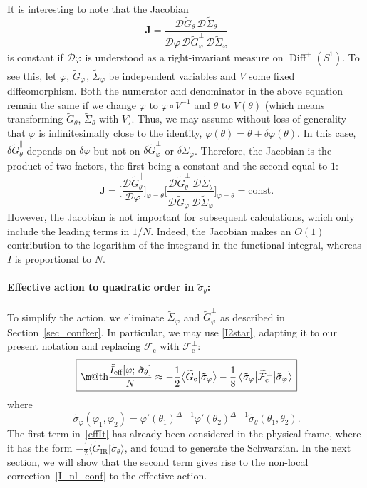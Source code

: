 \documentclass[12pt]{article}
\makeatletter
\newcommand*{\wideboxed}[1]{\setlength{\fboxsep}{1ex}%
  \fbox{\m@th$\displaystyle#1$}}
\newcommand{\blangle}{\bigl\langle}
\newcommand{\brangle}{\bigr\rangle}
\newcommand*{\brakett}[2]{\langle{#1}|{#2}\rangle}
\newcommand*{\bbraa}[1]{\blangle{#1}\big|}
\newcommand*{\bkett}[1]{\big|{#1}\brangle}
\newcommand*{\bbrakett}[2]{\blangle{#1}\big|{#2}\brangle}
\newcommand{\calD}{\mathcal{D}}
\newcommand{\calF}{\mathcal{F}}
\newcommand{\const}{\mathrm{const}}
\DeclareMathOperator{\Diff}{Diff}
\newcommand{\cc}{\mathrm{c}}
\newcommand{\eff}{\text{eff}}
\newcommand{\IR}{\text{IR}}
\newcommand{\tI}{\tilde{I}}
\newcommand{\tG}{\widetilde{G}}
\newcommand{\tF}{\widetilde{\calF}}
\newcommand{\tSig}{\widetilde{\Sigma}}
\newcommand{\tsig}{\tilde{\sigma}}
\newcommand{\vp}{\varphi}
\makeatother
\begin{document}
It is interesting to note that the Jacobian
\begin{equation}\label{Jacobian}
\mathbf{J}=\frac{\calD\tG_{\theta}\,\calD\tSig_{\theta}}
{\calD\vp\,\calD\tG_{\vp}^{\perp}\,\calD\tSig_{\vp}}
\end{equation}
is constant if $\calD\vp$ is understood as a right-invariant measure on $\Diff^{+}(S^1)$. To see this, let $\vp$, $\tG_{\vp}^{\perp}$, $\tSig_{\vp}$ be independent variables and $V$ some fixed diffeomorphism. Both the numerator and denominator in the above equation remain the same if we change $\vp$ to $\vp\circ V^{-1}$ and $\theta$ to $V(\theta)$ (which means transforming $\tG_{\theta}$, $\tSig_{\theta}$ with $V$). Thus, we may assume without loss of generality that $\vp$ is infinitesimally close to the identity, $\vp(\theta)=\theta+\delta\vp(\theta)$. In this case, $\delta\tG_{\theta}^{\parallel}$ depends on $\delta\vp$ but not on $\delta\tG_{\vp}^{\perp}$ or $\delta\tSig_{\vp}$. Therefore, the Jacobian is the product of two factors, the first being a constant and the second equal to $1$:
\begin{equation}
\mathbf{J}=\biggl[\frac{\calD\tG_{\theta}^{\parallel}}
{\calD\vp}\biggr]_{\vp=\theta}
\biggl[\frac{\calD\tG_{\theta}^{\perp}\,\calD\tSig_{\theta}}
{\calD\tG_{\vp}^{\perp}\,\calD\tSig_{\vp}}\biggr]_{\vp=\theta}
=\const.
\end{equation}
However, the Jacobian is not important for subsequent calculations, which only include the leading terms in $1/N$. Indeed, the Jacobian makes an $O(1)$ contribution to the logarithm of the integrand in the functional integral, whereas $\tI$ is proportional to $N$.

\paragraph{Effective action to quadratic order in $\tsig_\theta$:}
To simplify the action, we eliminate $\tSig_{\vp}$ and $\tG_{\vp}^{\perp}$ as described in Section~\ref{sec_confker}. In particular, we may use \eqref{I2star}, adapting it to our present notation and replacing $\calF_{\cc}$ with $\calF^{\perp}_{\cc}$:
\begin{equation} \label{effIt}
\wideboxed{
\frac{\tI_{\eff}[\vp;\,\tsig_{\theta}]}{N}
\approx-\frac{1}{2}\bbrakett{\tG_{\cc}}{\tsig_{\vp}}
-\frac{1}{8}\,\bbraa{\tsig_{\vp}}\tF^{\perp}_{\cc}\bkett{\tsig_{\vp}}
}
\end{equation}
where
\begin{equation}
\tsig_{\vp}(\vp_1,\vp_2)
=\vp'(\theta_1)^{\Delta-1}\vp'(\theta_2)^{\Delta-1}
\tsig_{\theta}(\theta_1,\theta_2).
\end{equation}
The first term in~\eqref{effIt} has already been considered in the physical frame, where it has the form $-\frac{1}{2}\brakett{\tG_{\IR}}{\tsig_{\theta}}$, and found to generate the Schwarzian. In the next section, we will show that the second term gives rise to the non-local correction~\eqref{I_nl_conf} to the effective action.
\end{document}
